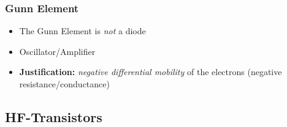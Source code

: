 \subsubsection{Gunn Element}
\begin{itemize}
    \itemsep0pt
    \item The Gunn Element is \textit{not} a diode
    \item Oscillator/Amplifier
    \item \textbf{Justification:} \textit{negative differential mobility} of the electrons (negative resistance/conductance)
\end{itemize}

\subsection{HF-Transistors}
